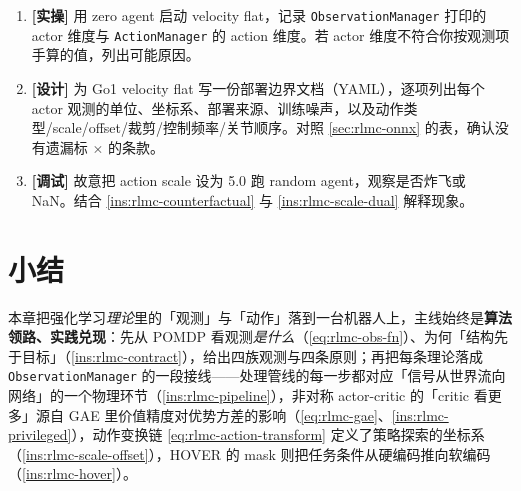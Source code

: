 \begin{practice}[练习·部署与验证]
\begin{enumerate}
  \item \textbf{[实操]} 用 zero agent 启动 velocity flat，记录 \verb|ObservationManager| 打印的 actor 维度与 \verb|ActionManager| 的 action 维度。若 actor 维度不符合你按观测项手算的值，列出可能原因。
  \item \textbf{[设计]} 为 Go1 velocity flat 写一份部署边界文档（YAML），逐项列出每个 actor 观测的单位、坐标系、部署来源、训练噪声，以及动作类型/scale/offset/裁剪/控制频率/关节顺序。对照 \cref{sec:rlmc-onnx} 的表，确认没有遗漏标 $\times$ 的条款。
  \item \textbf{[调试]} 故意把 action scale 设为 5.0 跑 random agent，观察是否炸飞或 NaN。结合 \cref{ins:rlmc-counterfactual} 与 \cref{ins:rlmc-scale-dual} 解释现象。
\end{enumerate}
\end{practice}

\section{小结}
\label{sec:rlmc-summary}

本章把强化学习\emph{理论}里的「观测」与「动作」落到一台机器人上，主线始终是\textbf{算法领路、实践兑现}：先从 POMDP 看观测\emph{是什么}（\cref{eq:rlmc-obs-fn}）、为何「结构先于目标」（\cref{ins:rlmc-contract}），给出四族观测与四条原则；再把每条理论落成 \verb|ObservationManager| 的一段接线——处理管线的每一步都对应「信号从世界流向网络」的一个物理环节（\cref{ins:rlmc-pipeline}），非对称 actor-critic 的「critic 看更多」源自 GAE 里价值精度对优势方差的影响（\cref{eq:rlmc-gae}、\cref{ins:rlmc-privileged}），动作变换链 \cref{eq:rlmc-action-transform} 定义了策略探索的坐标系（\cref{ins:rlmc-scale-offset}），HOVER 的 mask 则把任务条件从硬编码推向软编码（\cref{ins:rlmc-hover}）。

